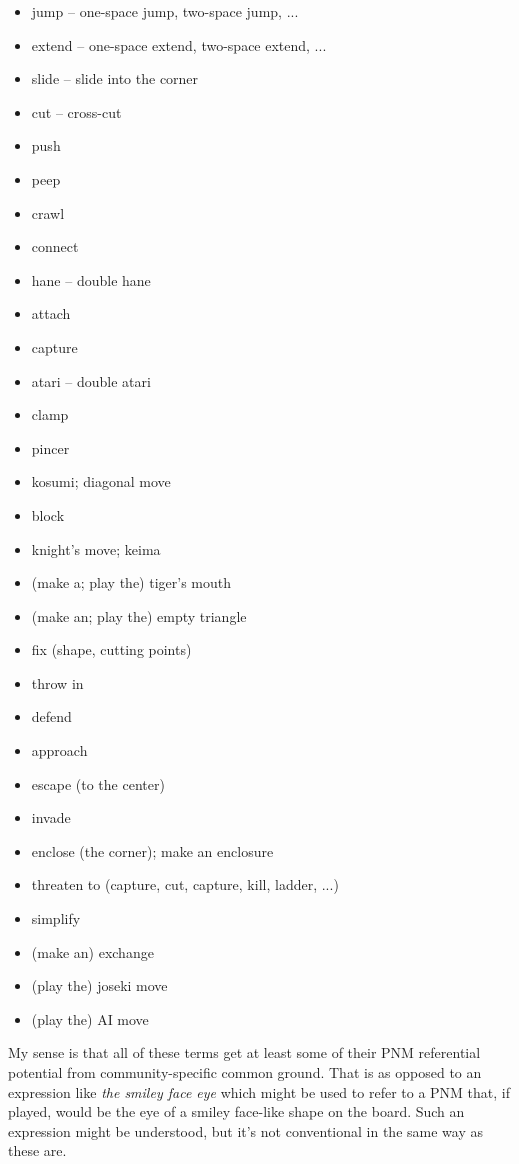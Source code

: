 \documentclass{scrartcl}
\begin{document}
\begin{multicols}{2}
\begin{itemize} 
  \item jump -- one-space jump, two-space jump, ...
  \item extend -- one-space extend, two-space extend, ...
  \item slide -- slide into the corner
  \item cut -- cross-cut
  \item push
  \item peep
  \item crawl
  \item connect
  \item hane -- double hane
  \item attach
  \item capture
  \item atari -- double atari
  \item clamp
  \item pincer
  \item kosumi; diagonal move
  \item block
  \item knight's move; keima
  \item (make a; play the) tiger's mouth
  \item (make an; play the) empty triangle
  \item fix (shape, cutting points)
  \item throw in
  \item defend
  \item approach
  \item escape (to the center)
  \item invade 
  \item enclose (the corner); make an enclosure
  \item threaten to (capture, cut, capture, kill, ladder, ...)
  \item simplify
  \item (make an) exchange
  \item (play the) joseki move
  \item (play the) AI move
\end{itemize}
\end{multicols}

\noindent My sense is that all of these terms get at least some of
their PNM referential potential from community-specific common ground.
That is as opposed to an expression like \emph{the smiley face eye}
which might be used to refer to a PNM that, if played, would be the eye
of a smiley face-like shape on the board.
Such an expression might be understood, but it's not conventional in 
the same way as these are.
\end{document}
